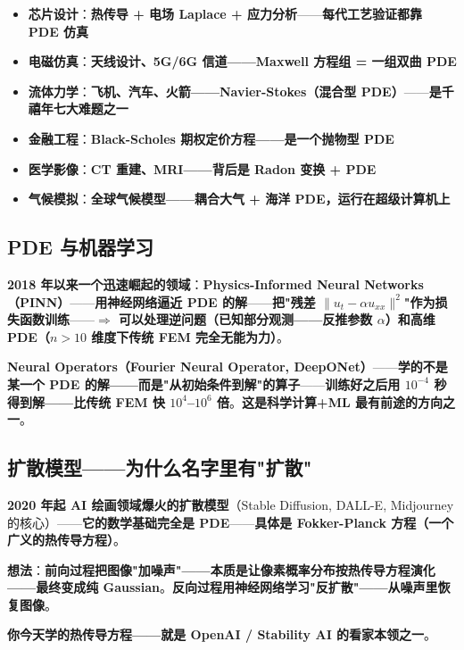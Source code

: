 \begin{itemize}
\item \textbf{芯片设计}：\textbf{热传导 + 电场 Laplace + 应力分析}——\textbf{每代工艺验证都靠 PDE 仿真}
\item \textbf{电磁仿真}：\textbf{天线设计、5G/6G 信道——Maxwell 方程组 = 一组双曲 PDE}
\item \textbf{流体力学}：\textbf{飞机、汽车、火箭——Navier-Stokes（混合型 PDE）}——\textbf{是\textbf{千禧年七大难题之一}}
\item \textbf{金融工程}：\textbf{Black-Scholes 期权定价方程——是一个抛物型 PDE}
\item \textbf{医学影像}：\textbf{CT 重建、MRI——背后是 Radon 变换 + PDE}
\item \textbf{气候模拟}：\textbf{全球气候模型——耦合大气 + 海洋 PDE，运行在超级计算机上}
\end{itemize}

\subsection{PDE 与机器学习}

\textbf{2018 年以来一个迅速崛起的领域}：\textbf{\textbf{Physics-Informed Neural Networks（PINN）}}——\textbf{用神经网络逼近 PDE 的解}——\textbf{把"残差 $\| u_t - \alpha u_{xx} \|^2$"作为损失函数训练}——\textbf{$\Longrightarrow$ 可以处理\textbf{逆问题}（已知部分观测——反推参数 $\alpha$）和\textbf{高维 PDE}（$n>10$ 维度下传统 FEM 完全无能为力）}。

\textbf{\textbf{Neural Operators}（Fourier Neural Operator, DeepONet）}——\textbf{学的不是某一个 PDE 的解——而是"从初始条件到解"的算子}——\textbf{训练好之后用 $10^{-4}$ 秒得到解——比传统 FEM 快 $10^4$--$10^6$ 倍}。\textbf{这是\textbf{科学计算+ML} 最有前途的方向之一}。

\subsection{扩散模型——为什么名字里有"扩散"}

\textbf{2020 年起 AI 绘画领域爆火的\textbf{扩散模型}}（Stable Diffusion, DALL-E, Midjourney 的核心）——\textbf{它的数学基础\textbf{完全是 PDE}}——\textbf{具体是 Fokker-Planck 方程（一个广义的热传导方程）}。

\textbf{想法}：\textbf{前向过程把图像"加噪声"——本质是让像素概率分布按热传导方程演化——最终变成纯 Gaussian}。\textbf{反向过程用神经网络学习"反扩散"——从噪声里恢复图像}。

\textbf{你今天学的热传导方程——就是 OpenAI / Stability AI 的看家本领之一}。

